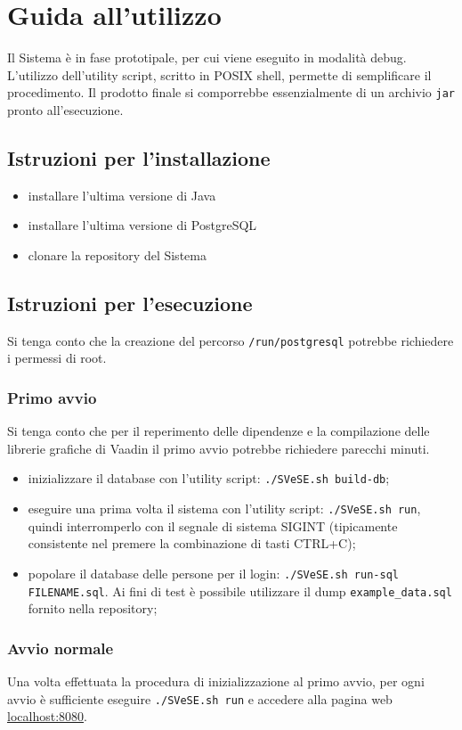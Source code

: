 \chapter{Guida all'utilizzo}\label{utilizzo}
Il Sistema è in fase prototipale, per cui viene eseguito in modalità debug. L'utilizzo dell'utility script, scritto in POSIX shell, permette di semplificare il procedimento. Il prodotto finale si comporrebbe essenzialmente di un archivio \verb!jar! pronto all'esecuzione.




\section{Istruzioni per l'installazione}
\begin{itemize}
\item installare l'ultima versione di Java
\item installare l'ultima versione di PostgreSQL
\item clonare la repository del Sistema
\end{itemize}




\section{Istruzioni per l'esecuzione}
Si tenga conto che la creazione del percorso \verb!/run/postgresql! potrebbe richiedere i permessi di root.

\subsection{Primo avvio}
Si tenga conto che per il reperimento delle dipendenze e la compilazione delle librerie grafiche di Vaadin il primo avvio potrebbe richiedere parecchi minuti.
\begin{itemize}
	\item inizializzare il database con l'utility script: \verb!./SVeSE.sh build-db!;
	\item eseguire una prima volta il sistema con l'utility script: \verb!./SVeSE.sh run!, quindi interromperlo con il segnale di sistema SIGINT (tipicamente consistente nel premere la combinazione di tasti CTRL+C);
	\item popolare il database delle persone per il login: \verb!./SVeSE.sh run-sql FILENAME.sql!. Ai fini di test è possibile utilizzare il dump \verb!example_data.sql! fornito nella repository;
\end{itemize}

\subsection{Avvio normale}
Una volta effettuata la procedura di inizializzazione al primo avvio, per ogni avvio è sufficiente eseguire \verb!./SVeSE.sh run! e accedere alla pagina web \url{localhost:8080}.
